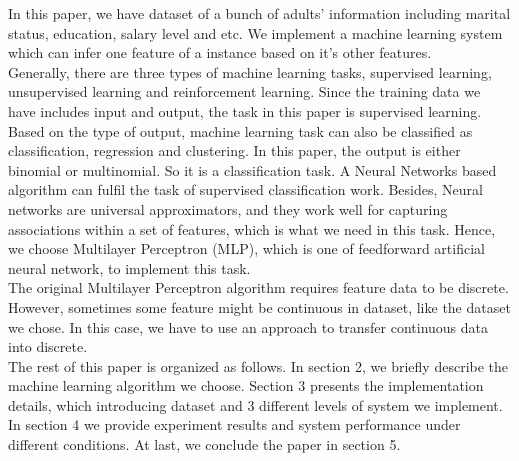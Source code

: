 \documentclass[11pt,letterpaper]{article}
\begin{document}
In this paper, we have dataset of a bunch of adults' information including marital status, education, salary level and etc. We implement a machine learning system which can infer one feature of a instance based on it's other features.
\\
Generally, there are three types of machine learning tasks, supervised learning, unsupervised learning and reinforcement learning. Since the training data we have includes input and output, the task in this paper is supervised learning. Based on the type of output, machine learning task can also be classified as classification, regression and clustering. In this paper, the output is either binomial or multinomial. So it is a classification task. A Neural Networks based algorithm can fulfil the task of supervised classification work. Besides, Neural networks are universal approximators, and they work well for capturing associations within a set of features, which is what we need in this task. Hence, we choose Multilayer Perceptron (MLP), which is one of feedforward artificial neural network, to implement this task.
\\
The original Multilayer Perceptron algorithm requires feature data to be discrete. However, sometimes some feature might be continuous in dataset, like the dataset we chose. In this case, we have to use an approach to transfer continuous data into discrete.
\\
The rest of this paper is organized as follows. In section 2, we briefly describe the machine learning algorithm we choose. Section 3 presents the implementation details, which introducing dataset and 3 different levels of system we implement. In section 4 we provide experiment results and system performance under different conditions. At last, we conclude the paper in section 5.
\end{document}
